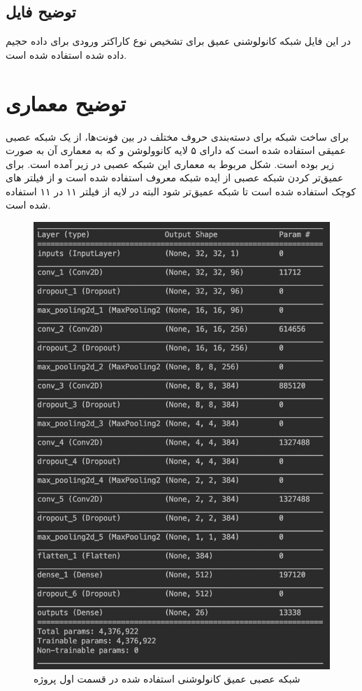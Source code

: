 \documentclass{article}
\begin{document}
\subsection{توضیح فایل }
در این فایل شبکه کانولوشنی عمیق برای تشخیص نوع کاراکتر ورودی برای داده‌ حجیم داده 
شده استفاده شده است.
\section{توضیح معماری }
برای ساخت شبکه‌  برای دسته‌بندی حروف مختلف در بین فونت‌ها، از یک شبکه عصبی عمیقی استفاده شده است که دارای ۵ لایه کانوولوشن و  که به معماری آن به صورت زیر بوده است. شکل مربوط به معماری این شبکه‌ عصبی در زیر آمده است. برای عمیق‌تر کردن شبکه عصبی از ایده شبکه معروف  استفاده شده است و از فیلتر های کوچک استفاده شده است تا شبکه عمیق‌تر شود البته در لایه از فیلتر ۱۱ در ۱۱ استفاده شده است. 

\begin{figure}[H]
	\centerline{\includegraphics[width=\textwidth , height=\textheight ]{CNN}}
	\caption{شبکه عصبی عمیق کانولوشنی استفاده شده در قسمت اول پروژه}
\end{figure}
\end{document}
